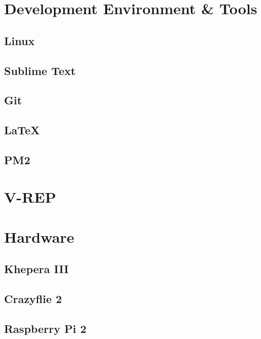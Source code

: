 \section{Development Environment \& Tools}
\subsection{Linux}
\subsection{Sublime Text}
\subsection{Git}
\subsection{\LaTeX}
\subsection{PM2}
\section{V-REP}
\section{Hardware}
\subsection{Khepera III} \label{kheperaIII}
\subsection{Crazyflie 2}
\subsection{Raspberry Pi 2}
